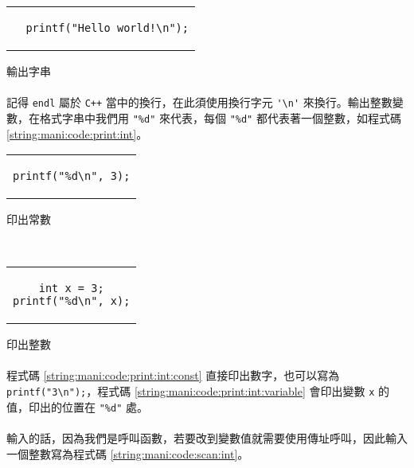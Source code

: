 \documentclass[12pt,a4paper,oneside]{article}
\begin{document}
\begin{CJK}{UTF8}{bkai}
\begin{code}[h!]
  \centering
  \begin{tabular}{c}
  \begin{lstlisting}
  printf("Hello world!\n");
  \end{lstlisting}
  \end{tabular}
  \caption{輸出字串}
  \label{string:mani:code:printf:string}
\end{code}

\paragraph{}記得 \lstinline!endl! 屬於 \texttt{C++} 當中的換行，在此須使用換行字元 \lstinline!'\n'! 來換行。輸出整數變數，在格式字串中我們用 \lstinline!"%d"! 來代表，每個 \lstinline!"%d"! 都代表著一個整數，如程式碼 \ref{string:mani:code:print:int}。

\begin{code}[h!]
  \centering
  \begin{subcode}{.33\textwidth}
    \centering
    \begin{tabular}{c}
    \begin{lstlisting}
printf("%d\n", 3);
    \end{lstlisting}
    \end{tabular}
    \caption{印出常數}
    \label{string:mani:code:print:int:const}
  \end{subcode}
  ~
  \begin{subcode}{.33\textwidth}
    \centering
    \begin{tabular}{c}
    \begin{lstlisting}
int x = 3;
printf("%d\n", x);
    \end{lstlisting}
    \end{tabular}
    \caption{印出 \lstinline!int! 變數}
    \label{string:mani:code:print:int:variable}
  \end{subcode}
  \caption{印出整數}
  \label{string:mani:code:print:int}
\end{code}

\paragraph{}程式碼 \ref{string:mani:code:print:int:const} 直接印出數字，也可以寫為 \lstinline!printf("3\n");!，程式碼 \ref{string:mani:code:print:int:variable} 會印出變數 \lstinline!x! 的值，印出的位置在 \lstinline!"%d"! 處。
\paragraph{}輸入的話，因為我們是呼叫函數，若要改到變數值就需要使用傳址呼叫，因此輸入一個整數寫為程式碼 \ref{string:mani:code:scan:int}。


\end{CJK}
\end{document}
